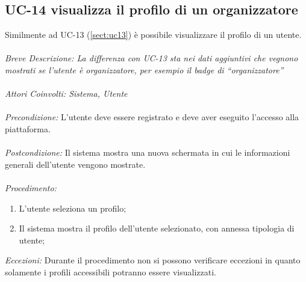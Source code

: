 \subsection{UC-14 visualizza il profilo di un organizzatore}
Similmente ad UC-13 (\ref{sect:uc13}) è possibile visualizzare il profilo di un utente.
\\
\\
\textit{Breve Descrizione: La differenza con UC-13 sta nei dati aggiuntivi che vegnono mostrati se l'utente è organizzatore, per esempio il badge di ``organizzatore''} 
\\
\\
\textit{Attori Coinvolti: Sistema, Utente}
\\
\\
\textit{Precondizione:} L'utente deve essere registrato e deve aver eseguito l'accesso alla piattaforma.
\\
\\
\textit{Postcondizione:} Il sistema mostra una nuova schermata in cui le informazioni generali dell'utente vengono mostrate.
\\
\\
\textit{Procedimento:}
\begin{enumerate}
	\item L'utente seleziona un profilo;
	\item Il sistema mostra il profilo dell'utente selezionato, con annessa tipologia di utente;
\end{enumerate}

\textit{Eccezioni:} Durante il procedimento non si possono verificare eccezioni in quanto solamente i profili accessibili potranno essere visualizzati.
